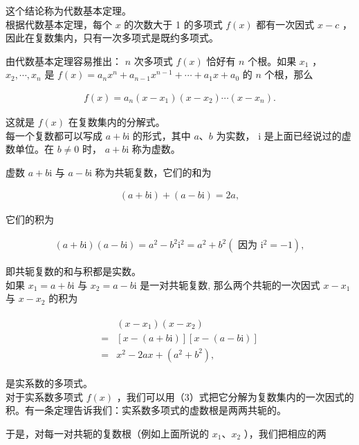 \documentclass[10pt]{article}
\begin{document}
这个结论称为代数基本定理。\\
根据代数基本定理，每个 $x$ 的次数大于 1 的多项式 $f(x)$ 都有一次因式 $x-c$ ，因此在复数集内，只有一次多项式是既约多项式。

由代数基本定理容易推出： $n$ 次多项式 $f(x)$ 恰好有 $n$ 个根。如果 $x_{1}$ ， $x_{2}, \cdots, x_{n}$ 是 $f(x)=a_{n} x^{n}+a_{n-1} x^{n-1}+\cdots+a_{1} x+a_{0}$ 的 $n$ 个根，那么

\begin{align*}
f(x)=a_{n}\left(x-x_{1}\right)\left(x-x_{2}\right) \cdots\left(x-x_{n}\right) . \tag{3}
\end{align*}

这就是 $f(x)$ 在复数集内的分解式。\\
每一个复数都可以写成 $a+b \mathrm{i}$ 的形式，其中 $a 、 b$ 为实数， i 是上面已经说过的虚数单位。在 $b \neq 0$ 时， $a+b \mathrm{i}$ 称为虚数。

虚数 $a+b \mathrm{i}$ 与 $a-b \mathrm{i}$ 称为共轭复数，它们的和为

\begin{align*}
(a+b \mathrm{i})+(a-b \mathrm{i})=2 a,
\end{align*}

它们的积为

\begin{align*}
(a+b \mathrm{i})(a-b \mathrm{i})=a^{2}-b^{2} \mathrm{i}^{2}=a^{2}+b^{2}\left(\text { 因为 } \mathrm{i}^{2}=-1\right),
\end{align*}

即共轭复数的和与积都是实数。\\
如果 $x_{1}=a+b \mathrm{i}$ 与 $x_{2}=a-b \mathrm{i}$ 是一对共轭复数, 那么两个共轭的一次因式 $x-x_{1}$ 与 $x-x_{2}$ 的积为

\begin{align*}
\begin{aligned}
& \left(x-x_{1}\right)\left(x-x_{2}\right) \\
= & {[x-(a+b \mathrm{i})][x-(a-b \mathrm{i})] } \\
= & x^{2}-2 a x+\left(a^{2}+b^{2}\right),
\end{aligned}
\end{align*}

是实系数的多项式。\\
对于实系数多项式 $f(x)$ ，我们可以用（3）式把它分解为复数集内的一次因式的积。有一条定理告诉我们：实系数多项式的虚数根是两两共轭的。

于是，对每一对共轭的复数根（例如上面所说的 $x_{1} 、 x_{2}$ ），我们把相应的两
\end{document}

